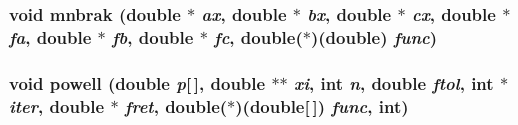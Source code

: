 \subsubsection{\setlength{\rightskip}{0pt plus 5cm}void mnbrak (double $\ast$ {\em ax}, double $\ast$ {\em bx}, double $\ast$ {\em cx}, double $\ast$ {\em fa}, double $\ast$ {\em fb}, double $\ast$ {\em fc}, double($\ast$)(double) {\em func})}\label{minimize_8h_ae863d3c940914dec464bad3f8c74e30}


\subsubsection{\setlength{\rightskip}{0pt plus 5cm}void powell (double {\em p}[$\,$], double $\ast$$\ast$ {\em xi}, int {\em n}, double {\em ftol}, int $\ast$ {\em iter}, double $\ast$ {\em fret}, double($\ast$)(double[$\,$]) {\em func}, int)}\label{minimize_8h_8202218f98db1e6c89301dfac62c676f}


